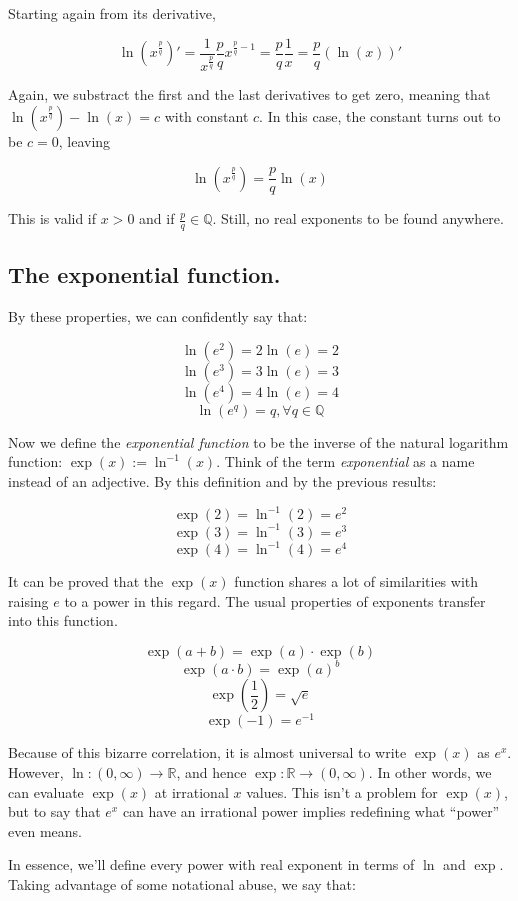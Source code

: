 Starting again from its derivative,

$$\ln(x^{\frac{p}{q}})' = \frac{1}{x^{\frac{p}{q}}} \frac{p}{q} x^{\frac{p}{q} - 1} = \frac{p}{q} \frac{1}{x} = \frac{p}{q} (\ln(x))'$$

Again, we substract the first and the last derivatives to get zero, meaning that $\ln(x^{\frac{p}{q}}) - \ln(x) = c$ with constant $c$. In this case, the constant turns out to be $c = 0$, leaving

$$\ln(x^{\frac{p}{q}}) = \frac{p}{q} \ln(x)$$

This is valid if $x > 0$ and if $\frac{p}{q} \in \mathbb{Q}$. Still, no real exponents to be found anywhere.

\subsection{The exponential function.}

By these properties, we can confidently say that:

$$\ln(e^2) = 2\ln(e) = 2$$
$$\ln(e^3) = 3\ln(e) = 3$$
$$\ln(e^4) = 4\ln(e) = 4$$
$$\ln(e^{q}) = q, \forall q \in \mathbb{Q}$$

Now we define the \textit{exponential function} to be the inverse of the natural logarithm function: $\exp(x) := \ln^{-1}(x)$. Think of the term \textit{exponential} as a name instead of an adjective. By this definition and by the previous results:

$$\exp(2) = \ln^{-1}(2) = e^2$$
$$\exp(3) = \ln^{-1}(3) = e^3$$
$$\exp(4) = \ln^{-1}(4) = e^4$$

It can be proved that the $\exp(x)$ function shares a lot of similarities with raising $e$ to a power in this regard. The usual properties of exponents transfer into this function.

$$\exp(a + b) = \exp(a)\cdot \exp(b)$$
$$\exp(a \cdot b) = \exp(a)^b$$
$$\exp\left(\frac{1}{2}\right) = \sqrt{e}$$
$$\exp(-1) = e^{-1}$$

Because of this bizarre correlation, it is almost universal to write $\exp(x)$ as $e^x$. However, $\ln: (0, \infty) \to \mathbb{R}$, and hence $\exp: \mathbb{R} \to (0, \infty)$. In other words, we can evaluate $\exp(x)$ at irrational $x$ values. This isn't a problem for $\exp(x)$, but to say that $e^x$ can have an irrational power implies redefining what \enquote{power} even means.

In essence, we'll define every power with real exponent in terms of $\ln$ and $\exp$. Taking advantage of some notational abuse, we say that:

